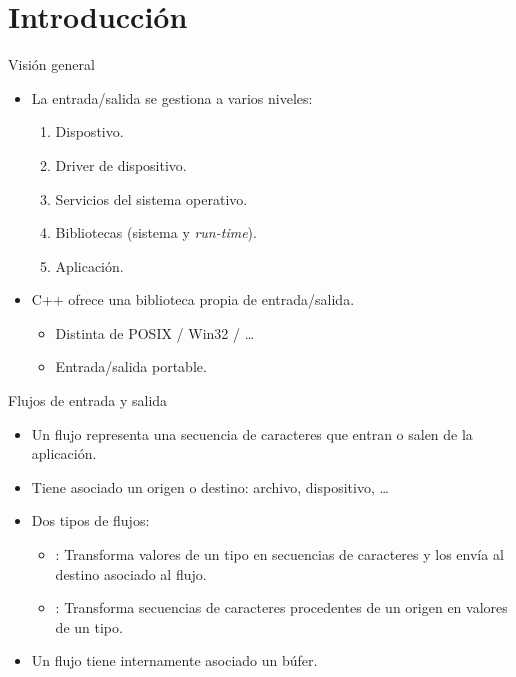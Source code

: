 \section{Introducción}

\begin{frame}[t]{Visión general}
\begin{itemize}
  \item La entrada/salida se gestiona a varios niveles:
    \begin{enumerate}
      \item Dispostivo.
      \item Driver de dispositivo.
      \item Servicios del sistema operativo.
      \item Bibliotecas (sistema y \emph{run-time}).
      \item Aplicación.
    \end{enumerate}
  \item C++ ofrece una biblioteca propia de entrada/salida.
    \begin{itemize}
       \item Distinta de POSIX / Win32 / \ldots
       \item Entrada/salida portable.
    \end{itemize}
\end{itemize}
\end{frame}

\begin{frame}[t]{Flujos de entrada y salida}
\begin{itemize}
  \item Un flujo representa una secuencia de caracteres que entran o salen
        de la aplicación.
  \item Tiene asociado un origen o destino: archivo, dispositivo, \ldots
  \item Dos tipos de flujos:
    \begin{itemize}
      \item {}: Transforma valores de un tipo en secuencias de caracteres y los envía
            al destino asociado al flujo.
      \item {}: Transforma secuencias de caracteres procedentes de un origen
            en valores de un tipo.
    \end{itemize}
  \item Un flujo tiene internamente asociado un búfer.
\end{itemize}
\end{frame}


